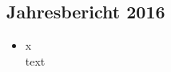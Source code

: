 \subsection{Jahresbericht 2016}
\begin{history}


    \begin{itemize}

        \item[]x\\
        text

    \end{itemize}

\end{history}
